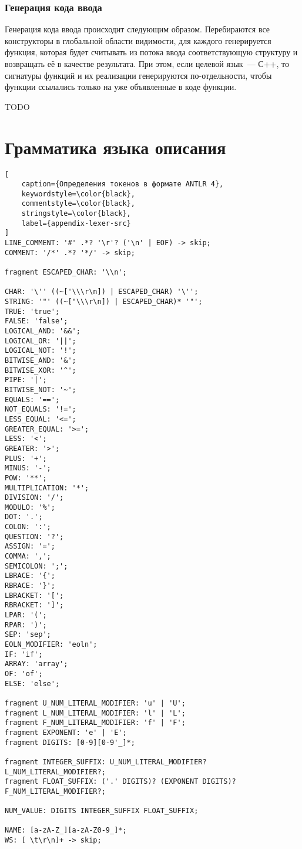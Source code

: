 \documentclass[times,specification,annotation]{style/itmo-student-thesis/itmo-student-thesis}
\begin{document}
\subsection{Генерация кода ввода}

Генерация кода ввода происходит следующим образом. Перебираются все конструкторы в глобальной области видимости, для каждого генерируется функция, которая будет считывать из потока ввода соответствующую структуру и возвращать её в качестве результата. При этом, если целевой язык~--- С++, то сигнатуры функций и их реализации генерируются по-отдельности, чтобы функции ссылались только на уже объявленные в коде функции.

\startconclusionpage

TODO

\printmainbibliography

\appendix

\chapter{Грамматика языка описания}\label{appendix-antlr-grammar}

\begin{lstlisting}[
    caption={Определения токенов в формате ANTLR 4},
    keywordstyle=\color{black},
    commentstyle=\color{black},
    stringstyle=\color{black},
    label={appendix-lexer-src}
]
LINE_COMMENT: '#' .*? '\r'? ('\n' | EOF) -> skip;
COMMENT: '/*' .*? '*/' -> skip;

fragment ESCAPED_CHAR: '\\n';

CHAR: '\'' ((~['\\\r\n]) | ESCAPED_CHAR) '\'';
STRING: '"' ((~["\\\r\n]) | ESCAPED_CHAR)* '"';
TRUE: 'true';
FALSE: 'false';
LOGICAL_AND: '&&';
LOGICAL_OR: '||';
LOGICAL_NOT: '!';
BITWISE_AND: '&';
BITWISE_XOR: '^';
PIPE: '|';
BITWISE_NOT: '~';
EQUALS: '==';
NOT_EQUALS: '!=';
LESS_EQUAL: '<=';
GREATER_EQUAL: '>=';
LESS: '<';
GREATER: '>';
PLUS: '+';
MINUS: '-';
POW: '**';
MULTIPLICATION: '*';
DIVISION: '/';
MODULO: '%';
DOT: '.';
COLON: ':';
QUESTION: '?';
ASSIGN: '=';
COMMA: ',';
SEMICOLON: ';';
LBRACE: '{';
RBRACE: '}';
LBRACKET: '[';
RBRACKET: ']';
LPAR: '(';
RPAR: ')';
SEP: 'sep';
EOLN_MODIFIER: 'eoln';
IF: 'if';
ARRAY: 'array';
OF: 'of';
ELSE: 'else';

fragment U_NUM_LITERAL_MODIFIER: 'u' | 'U';
fragment L_NUM_LITERAL_MODIFIER: 'l' | 'L';
fragment F_NUM_LITERAL_MODIFIER: 'f' | 'F';
fragment EXPONENT: 'e' | 'E';
fragment DIGITS: [0-9][0-9'_]*;

fragment INTEGER_SUFFIX: U_NUM_LITERAL_MODIFIER? L_NUM_LITERAL_MODIFIER?;
fragment FLOAT_SUFFIX: ('.' DIGITS)? (EXPONENT DIGITS)? F_NUM_LITERAL_MODIFIER?;

NUM_VALUE: DIGITS INTEGER_SUFFIX FLOAT_SUFFIX;

NAME: [a-zA-Z_][a-zA-Z0-9_]*;
WS: [ \t\r\n]+ -> skip;
\end{lstlisting}
\end{document}
